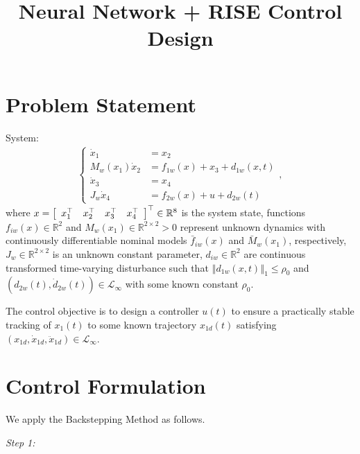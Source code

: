 \documentclass{article}
\title{Neural Network + RISE Control Design}
\begin{document}
	\maketitle
	\section{Problem Statement}
	System:
	\begin{align}
	\begin{cases}
	\dot{x}_{1} &= x_{2} \\
	M_{w}(x_{1})\dot{x}_{2} &= f_{1w}(x) + x_{3} + d_{1w}(x,t) \\
	\dot{x}_{3} &= x_{4} \\
	J_{w}\dot{x}_{4} &= f_{2w}(x) + u + d_{2w}(t)
	\end{cases},  \label{system}
	\end{align}
	where $x = \left[
	\begin{array}[c]{cccc}
	x_{1}^{\top} & x_{2}^{\top} & x_{3}^{\top} & x_{4}^{\top}
	\end{array}
	\right]^{\top} \in\mathbb{R}^{8}$ is the system state, functions $f_{iw}(x)\in\mathbb{R}^{2}$ and $M_{w}(x_{1})\in\mathbb{R}^{2\times 2}>0$ represent unknown dynamics with continuously differentiable nominal models $\bar{f}_{iw}(x)$ and $\bar{M}_{w}(x_{1})$, respectively,  $J_{w}\in\mathbb{R}^{2\times 2}$ is an unknown constant parameter,  $d_{iw}\in\mathbb{R}^{2}$ are continuous transformed time-varying disturbance such that $\left\Vert d_{1w}(x,t)\right\Vert_{1}\leq \rho_{0}$ and $\left(d_{2w}(t),\dot{d}_{2w}(t)\right)\in\mathcal{L}_{\infty}$ with some known constant $\rho_{0}$.
	
	The control objective is to design a controller $u(t)$ to ensure a practically stable tracking of $x_{1}(t)$ to some known trajectory $x_{1d}(t)$ satisfying $\left(x_{1d},\dot{x}_{1d},\ddot{x}_{1d}\right)\in\mathcal{L}_{\infty}$.
	
	\section{Control Formulation}
		We apply the Backstepping Method as follows.
	
	\begin{flushleft}
		\textit{Step 1:}
	\end{flushleft}
	
\end{document}
